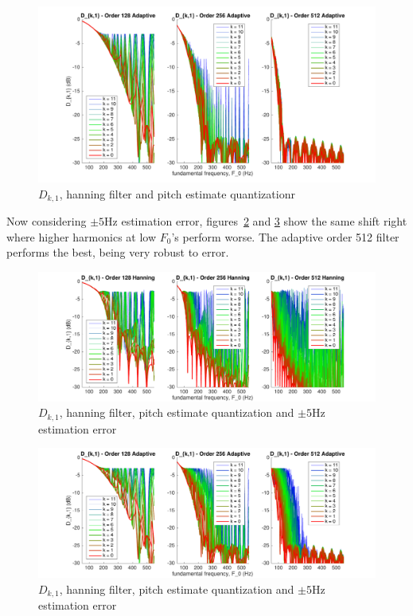\documentclass [11pt, proquest,oneside] {ganter_thesis}[2015/03/03]
\begin{document}
\begin{figure}[!ht]
  \centering
    \includegraphics[width=1\textwidth]{pitch_d_ki_2}
    \caption{$D_{k,1}$, hanning filter and pitch estimate quantizationr}\label{fig:pitch_d_ki_2}
\end{figure}

Now considering $\pm5$Hz estimation error, figures~\ref{fig:pitch_d_ki_1_error5} and \ref{fig:pitch_d_ki_2_error5} show the same shift right where higher harmonics at low $F_0$'s perform worse.  The adaptive order 512 filter performs the best, being very robust to error.

\begin{figure}[!ht]
  \centering
    \includegraphics[width=1\textwidth]{pitch_d_ki_1_error5}
    \caption{$D_{k,1}$, hanning filter, pitch estimate quantization and $\pm5$Hz estimation error}\label{fig:pitch_d_ki_1_error5}
\end{figure}

\begin{figure}[!ht]
  \centering
    \includegraphics[width=1\textwidth]{pitch_d_ki_2_error5}
    \caption{$D_{k,1}$, hanning filter, pitch estimate quantization and $\pm5$Hz estimation error}\label{fig:pitch_d_ki_2_error5}
\end{figure}
\end{document}

